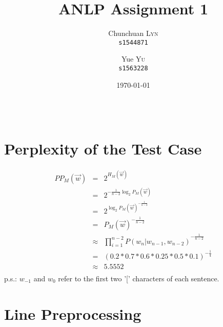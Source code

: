 \documentclass{article}
\title{ANLP Assignment 1} %
\author{
	Chunchuan \textsc{Lyn}\\
	\texttt{s1544871}
	\and
	Yue \textsc{Yu}\\
	\texttt{s1563228}
}
\date{\today} %
\begin{document}
\maketitle %

\begin{center}
\begin{tabular}{l r}
\end{tabular}
\end{center}


\section{Perplexity of the Test Case}
	
	\begin{eqnarray*}
	PP_M(\vec{w}) &=& 2^{H_M(\vec{w})}  \\
	&=& 2^{-\frac{1}{n-2} \log_2 P_M(\vec{w}) }  \\
	&=& 2^{\log_2 P_M(\vec{w})^{-\frac{1}{n-2}}} \\
	&=& P_M(\vec{w})^{-\frac{1}{n-2}} \\
	&\approx& {\prod_{i=1}^{n-2} P(w_n|w_{n-1},w_{n-2})}^{-\frac{1}{n-2}} \\
	&=& (0.2*0.7*0.6*0.25*0.5*0.1)^{-\frac{1}{4}} \\
	&\approx& 5.5552 \nonumber \\
	\end{eqnarray*}
	p.s.: $w_{-1}$ and $w_0$ refer to the first two {'['} characters of each sentence.

\section{Line Preprocessing}
\end{document}
